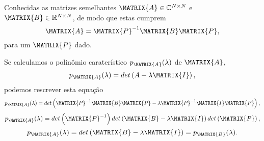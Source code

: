 \begin{myproofT}\label{proof:theo:similhante1}
Conhecidas as matrizes semelhantes $\MATRIX{A} \in \mathbb{C}^{N \times N}$ e $\MATRIX{B} \in \mathbb{R}^{N \times N}$,
de modo que estas cumprem 
\begin{equation}
\MATRIX{A} = \MATRIX{P}^{-1} \MATRIX{B} \MATRIX{P},
\end{equation}
para um $\MATRIX{P}$ dado.

Se calculamos o polinômio caraterístico $p_{\MATRIX{A}}(\lambda)$ de $\MATRIX{A}$,
\begin{equation}
p_{\MATRIX{A}}(\lambda)=det\left(A-\lambda \MATRIX{I}\right),
\end{equation}
podemos rescrever esta equação
\begin{equation}
p_{\MATRIX{A}}(\lambda)=det\left(\MATRIX{P}^{-1} \MATRIX{B} \MATRIX{P}-\lambda \MATRIX{P}^{-1} \MATRIX{I} \MATRIX{P} \right),
\end{equation}
\begin{equation}
p_{\MATRIX{A}}(\lambda)=det\left( \MATRIX{P}^{-1}\right)det\left( \MATRIX{B} -\lambda \MATRIX{I} \right)det\left( \MATRIX{P}\right),
\end{equation}
\begin{equation}
p_{\MATRIX{A}}(\lambda)=det\left( \MATRIX{B} -\lambda \MATRIX{I} \right) = p_{\MATRIX{B}}(\lambda).
\end{equation}
\end{myproofT}
